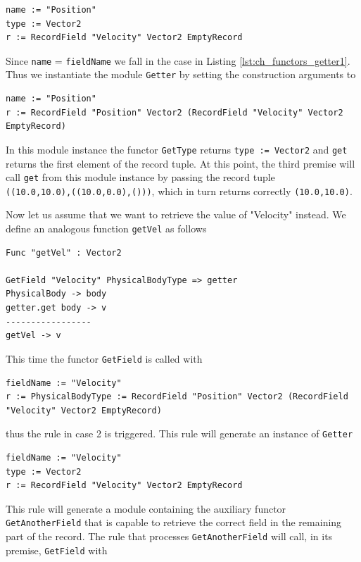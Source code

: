 \begin{lstlisting}
name := "Position"
type := Vector2
r := RecordField "Velocity" Vector2 EmptyRecord
\end{lstlisting}
 
\noindent
Since \texttt{name} = \texttt{fieldName} we fall in the case in Listing \ref{lst:ch_functors_getter1}. Thus we instantiate the module \texttt{Getter} by setting the construction arguments to 

\begin{lstlisting}
name := "Position"
r := RecordField "Position" Vector2 (RecordField "Velocity" Vector2 EmptyRecord)
\end{lstlisting}

\noindent
In this module instance the functor \texttt{GetType} returns \texttt{type :=  Vector2} and \texttt{get} returns the first element of the record tuple. At this point, the third premise will call \texttt{get} from this module instance by passing the record tuple\\ \texttt{((10.0,10.0),((10.0,0.0),()))}, which in turn returns correctly \texttt{(10.0,10.0)}.

Now let us assume that we want to retrieve the value of "Velocity" instead. We define an analogous function \texttt{getVel} as follows

\begin{lstlisting}
Func "getVel" : Vector2

GetField "Velocity" PhysicalBodyType => getter
PhysicalBody -> body
getter.get body -> v
-----------------
getVel -> v
\end{lstlisting}

\noindent
This time the functor \texttt{GetField} is called with

\begin{lstlisting}
fieldName := "Velocity"
r := PhysicalBodyType := RecordField "Position" Vector2 (RecordField "Velocity" Vector2 EmptyRecord)
\end{lstlisting}

\noindent
thus the rule in case 2 is triggered. This rule will generate an instance of \texttt{Getter}

\begin{lstlisting}
fieldName := "Velocity"
type := Vector2
r := RecordField "Velocity" Vector2 EmptyRecord
\end{lstlisting}

\noindent
This rule will generate a module containing the auxiliary functor\\ \texttt{GetAnotherField} that is capable to retrieve the correct field in the remaining part of the record. The rule that processes \texttt{GetAnotherField} will call, in its premise, \texttt{GetField} with

